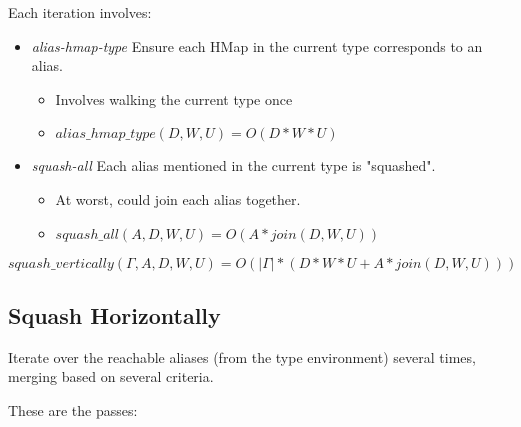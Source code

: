 Each iteration involves:

\begin{itemize}
  \item \emph{alias-hmap-type} Ensure each HMap in the current type corresponds to an alias.
		\begin{itemize}
			\item Involves walking the current type once
			\item $alias\_hmap\_type(D,W,U) = O(D*W*U)$
		\end{itemize}
  \item \emph{squash-all} Each alias mentioned in the current type is "squashed".
		\begin{itemize}
			\item At worst, could join each alias together.
			\item $squash\_all(A,D,W,U) = O(A*join(D, W, U))$
		\end{itemize}
\end{itemize}

\[
squash\_vertically(\Gamma, A, D, W, U) = O(|\Gamma| * (D*W*U + A*join(D, W, U)))
\]

\subsection{Squash Horizontally}
\label{squash-horizontally}

Iterate over the reachable aliases (from the type environment)
several times, merging based on several criteria.

These are the passes:

